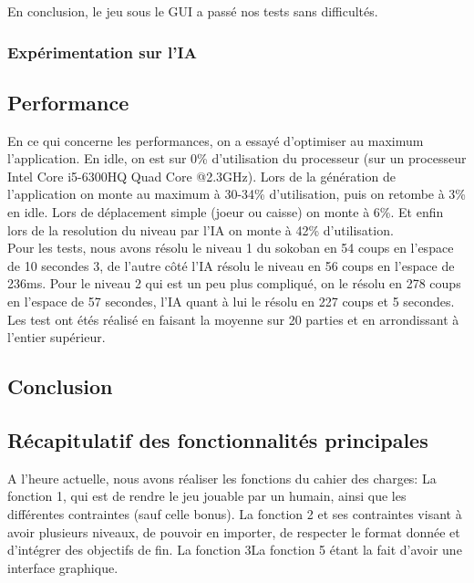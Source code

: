 \documentclass[a4paper,12pt]{article} %
\begin{document}
	En conclusion, le jeu sous le GUI a passé nos tests sans difficultés.
	
	\subsubsection{Expérimentation sur l'IA}

	\subsection{Performance}
	En ce qui concerne les performances, on a essayé d'optimiser au maximum l'application. En idle, on est sur 0\% d'utilisation du processeur (sur un processeur Intel Core i5-6300HQ Quad Core @2.3GHz). Lors de la génération de l'application on monte au maximum à 30-34\% d'utilisation, puis on retombe à 3\% en idle. Lors de déplacement simple (joeur ou caisse) on monte à 6\%. Et enfin lors de la resolution du niveau par l'IA on monte à  42\% d'utilisation.\\
	Pour les tests, nous avons résolu le niveau 1 du sokoban en 54 coups en l'espace de 10 secondes 3, de l'autre côté l'IA résolu le niveau en 56 coups en l'espace de 236ms. Pour le niveau 2 qui est un peu plus compliqué, on le résolu en 278 coups en l'espace de 57 secondes, l'IA quant à lui le résolu en 227 coups et 5 secondes. Les test ont étés réalisé en faisant la moyenne sur 20 parties et en arrondissant à l'entier supérieur.\\
	
	
\newpage

\begin{center}
\section{Conclusion}
\end{center}

	\subsection{Récapitulatif des fonctionnalités principales}
	A l'heure actuelle, nous avons réaliser les fonctions du cahier des charges: La fonction 1, qui est de rendre le jeu jouable par un humain, ainsi que les différentes contraintes (sauf celle bonus). La fonction 2 et ses contraintes visant à avoir plusieurs niveaux, de pouvoir en importer, de respecter le format donnée et d'intégrer des objectifs de fin. La fonction 3La fonction 5 étant la fait d'avoir une interface graphique.
\end{document}
